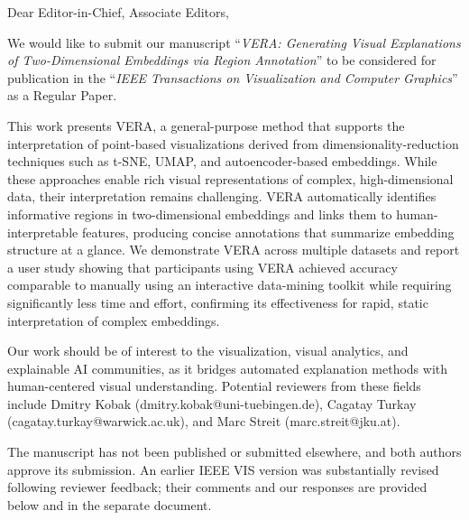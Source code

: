 \documentclass[11pt]{article}
\begin{document}
\onehalfspacing %
\setlength{\parskip}{3mm} %


\vspace{2mm}

\vspace{2mm}


\noindent Dear Editor-in-Chief, Associate Editors,\\
 
\vspace{3mm}

\noindent We would like to submit our manuscript ``\textit{VERA: Generating Visual Explanations of Two-Dimensional Embeddings via Region Annotation}'' to be considered for publication in the ``\textit{IEEE Transactions on Visualization and Computer Graphics}'' as a Regular Paper.

This work presents VERA, a general-purpose method that supports the interpretation of point-based visualizations derived from dimensionality-reduction techniques such as t-SNE, UMAP, and autoencoder-based embeddings. While these approaches enable rich visual representations of complex, high-dimensional data, their interpretation remains challenging. VERA automatically identifies informative regions in two-dimensional embeddings and links them to human-interpretable features, producing concise annotations that summarize embedding structure at a glance. We demonstrate VERA across multiple datasets and report a user study showing that participants using VERA achieved accuracy comparable to manually using an interactive data-mining toolkit while requiring significantly less time and effort, confirming its effectiveness for rapid, static interpretation of complex embeddings.

Our work should be of interest to the visualization, visual analytics, and explainable AI communities, as it bridges automated explanation methods with human-centered visual understanding. Potential reviewers from these fields include Dmitry Kobak (dmitry.kobak@uni-tuebingen.de), Cagatay Turkay (cagatay.turkay@warwick.ac.uk), and Marc Streit (marc.streit@jku.at).

The manuscript has not been published or submitted elsewhere, and both authors approve its submission. An earlier IEEE VIS version was substantially revised following reviewer feedback; their comments and our responses are provided below and in the separate document.
\end{document}
